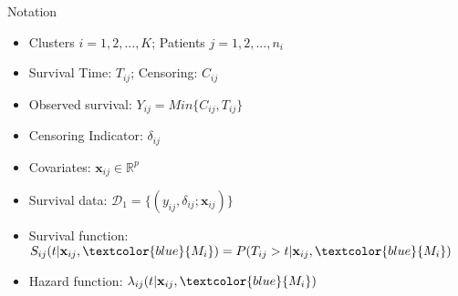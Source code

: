 \documentclass{beamer}
\begin{document}
\begin{frame}{Notation}
\protect\hypertarget{notation}{}
\begin{itemize}
\vfill \item
  Clusters \(i= 1,2,...,K\); Patients \(j = 1,2,...,n_i\) 
\vfill \item
  Survival Time: \(T_{ij}\); Censoring: \(C_{ij}\)
\vfill \item 
   Observed survival: \(Y_{ij}= Min\{C_{ij},T_{ij}\} \)
   
   \vfill \item Censoring
  Indicator: \(\delta_{ij}\)

\vfill \item
  Covariates:
  \(\mathbf{x}_{ij} \in \mathbb{R}^p\) 
\vfill \item
  Survival data: 
  \(\mathcal{D}_1= \{(y_{ij},\delta_{ij};\mathbf{x}_{ij})  \}\)
  
\vfill \item
  Survival function:
  \(S_{ij}(t| \mathbf{x}_{ij},\textcolor{blue}{M_i})= P(T_{ij}>t|\mathbf{x}_{ij},\textcolor{blue}{M_i})\)
\vfill \item
  Hazard function:
  \(\lambda_{ij}(t|\mathbf{x}_{ij},\textcolor{blue}{M_i})\)
\end{itemize}
\end{frame}
\end{document}
